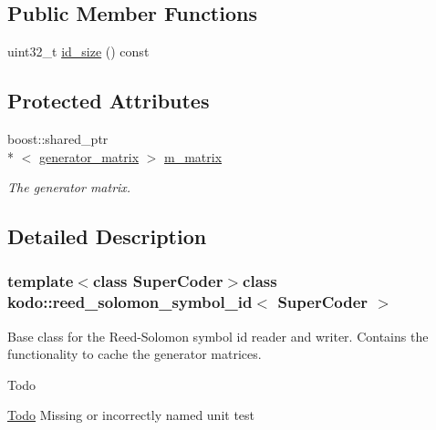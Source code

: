 \subsection*{Public Member Functions}
\begin{DoxyCompactItemize}
\item 
uint32\-\_\-t \hyperlink{classkodo_1_1reed__solomon__symbol__id_a7467650b1d2681c86c51ce370c5b8fca}{id\-\_\-size} () const 
\begin{DoxyCompactList}\small\item\em \end{DoxyCompactList}\end{DoxyCompactItemize}
\subsection*{Protected Attributes}
\begin{DoxyCompactItemize}
\item 
\hypertarget{classkodo_1_1reed__solomon__symbol__id_ad6367f45f85f688b41e17e65e9f69ebe}{boost\-::shared\-\_\-ptr\\*
$<$ \hyperlink{classkodo_1_1reed__solomon__symbol__id_a31ea4775995d9c87abb285734b7ff21a}{generator\-\_\-matrix} $>$ \hyperlink{classkodo_1_1reed__solomon__symbol__id_ad6367f45f85f688b41e17e65e9f69ebe}{m\-\_\-matrix}}\label{classkodo_1_1reed__solomon__symbol__id_ad6367f45f85f688b41e17e65e9f69ebe}

\begin{DoxyCompactList}\small\item\em The generator matrix. \end{DoxyCompactList}\end{DoxyCompactItemize}


\subsection{Detailed Description}
\subsubsection*{template$<$class Super\-Coder$>$class kodo\-::reed\-\_\-solomon\-\_\-symbol\-\_\-id$<$ Super\-Coder $>$}

Base class for the Reed-\/\-Solomon symbol id reader and writer. Contains the functionality to cache the generator matrices. 

\begin{DoxyRefDesc}{Todo}
\item[\hyperlink{todo__todo000044}{Todo}]Missing or incorrectly named unit test\end{DoxyRefDesc}


